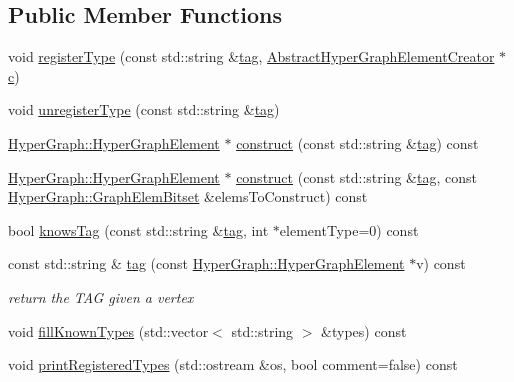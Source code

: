 \subsection*{Public Member Functions}
\begin{DoxyCompactItemize}
\item 
void \hyperlink{classg2o_1_1Factory_aba2f2e40635fd1b996981cefdb65c346}{register\+Type} (const std\+::string \&\hyperlink{classg2o_1_1Factory_a337d1377ea4e47c31dd04e85e51a2516}{tag}, \hyperlink{classg2o_1_1AbstractHyperGraphElementCreator}{Abstract\+Hyper\+Graph\+Element\+Creator} $\ast$\hyperlink{sparse__helper_8cpp_a4e1e0e72dd773439e333c84dd762a9c3}{c})
\item 
void \hyperlink{classg2o_1_1Factory_a01b16c7d5a49ddab5ccd5980f76900b7}{unregister\+Type} (const std\+::string \&\hyperlink{classg2o_1_1Factory_a337d1377ea4e47c31dd04e85e51a2516}{tag})
\item 
\hyperlink{structg2o_1_1HyperGraph_1_1HyperGraphElement}{Hyper\+Graph\+::\+Hyper\+Graph\+Element} $\ast$ \hyperlink{classg2o_1_1Factory_afd0e0c7021e344087a09ade1c11bc15c}{construct} (const std\+::string \&\hyperlink{classg2o_1_1Factory_a337d1377ea4e47c31dd04e85e51a2516}{tag}) const 
\item 
\hyperlink{structg2o_1_1HyperGraph_1_1HyperGraphElement}{Hyper\+Graph\+::\+Hyper\+Graph\+Element} $\ast$ \hyperlink{classg2o_1_1Factory_adb39d806299cacf7e1d4f982bc22a45f}{construct} (const std\+::string \&\hyperlink{classg2o_1_1Factory_a337d1377ea4e47c31dd04e85e51a2516}{tag}, const \hyperlink{classg2o_1_1HyperGraph_a7b8fda20e1b03e92aeceeac6e8218b73}{Hyper\+Graph\+::\+Graph\+Elem\+Bitset} \&elems\+To\+Construct) const 
\item 
bool \hyperlink{classg2o_1_1Factory_a57d370d8b31c214215cd6df31e5eb472}{knows\+Tag} (const std\+::string \&\hyperlink{classg2o_1_1Factory_a337d1377ea4e47c31dd04e85e51a2516}{tag}, int $\ast$element\+Type=0) const 
\item 
const std\+::string \& \hyperlink{classg2o_1_1Factory_a337d1377ea4e47c31dd04e85e51a2516}{tag} (const \hyperlink{structg2o_1_1HyperGraph_1_1HyperGraphElement}{Hyper\+Graph\+::\+Hyper\+Graph\+Element} $\ast$v) const 
\begin{DoxyCompactList}\small\item\em return the T\+AG given a vertex \end{DoxyCompactList}\item 
void \hyperlink{classg2o_1_1Factory_ae7c0f4e892d3c5af8cd198ceb144476f}{fill\+Known\+Types} (std\+::vector$<$ std\+::string $>$ \&types) const 
\item 
void \hyperlink{classg2o_1_1Factory_a0a9e898c4025151062856f4aa5ab6092}{print\+Registered\+Types} (std\+::ostream \&os, bool comment=false) const 
\end{DoxyCompactItemize}
